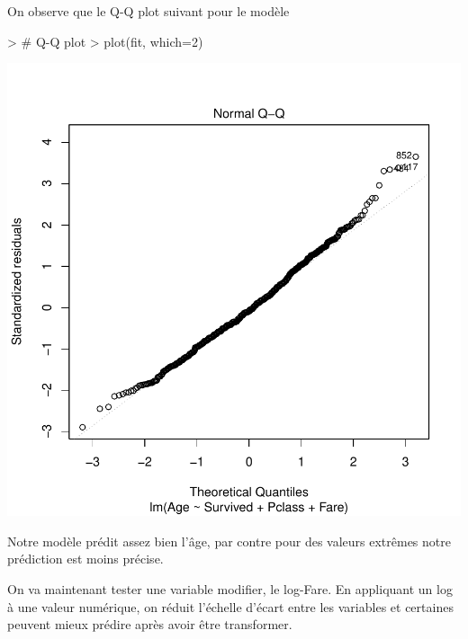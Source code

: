 \documentclass[11pt,french]{report}
\begin{document}
\bigskip
On observe que le Q-Q plot suivant pour le modèle

\begin{Schunk}
\begin{Sinput}
> # Q-Q plot 
> plot(fit, which=2)
\end{Sinput}
\end{Schunk}
\includegraphics{notes_de_cours-040}

\bigskip
Notre modèle prédit assez bien l'âge, par contre pour des valeurs extrêmes notre prédiction est moins précise. \newline

On va maintenant tester une variable modifier, le log-Fare. En appliquant un log à une valeur numérique, on réduit l'échelle d'écart entre les variables et certaines peuvent mieux prédire après avoir être transformer.
\end{document}
